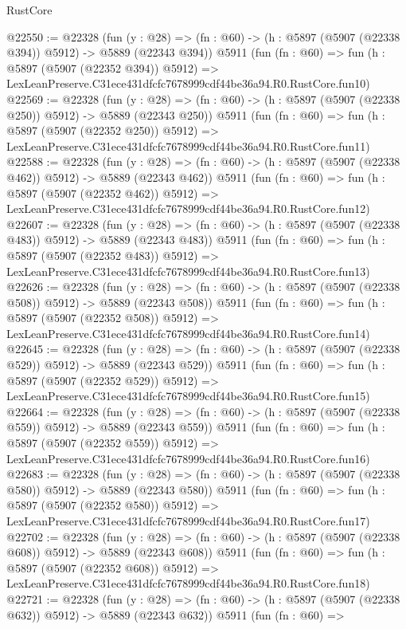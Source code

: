 \begin{lexlean}{RustCore}
\begin{coremodule}
@22550 := @22328
    (fun (y : @28) => (fn : @60) -> (h : @5897 (@5907 (@22338 @394)) @5912) -> @5889 (@22343 @394))
    @5911
    (fun (fn : @60) =>
    fun (h : @5897 (@5907 (@22352 @394)) @5912) =>
    LexLeanPreserve.C31ece431dfcfc7678999cdf44be36a94.R0.RustCore.fun10)
@22569 := @22328
    (fun (y : @28) => (fn : @60) -> (h : @5897 (@5907 (@22338 @250)) @5912) -> @5889 (@22343 @250))
    @5911
    (fun (fn : @60) =>
    fun (h : @5897 (@5907 (@22352 @250)) @5912) =>
    LexLeanPreserve.C31ece431dfcfc7678999cdf44be36a94.R0.RustCore.fun11)
@22588 := @22328
    (fun (y : @28) => (fn : @60) -> (h : @5897 (@5907 (@22338 @462)) @5912) -> @5889 (@22343 @462))
    @5911
    (fun (fn : @60) =>
    fun (h : @5897 (@5907 (@22352 @462)) @5912) =>
    LexLeanPreserve.C31ece431dfcfc7678999cdf44be36a94.R0.RustCore.fun12)
@22607 := @22328
    (fun (y : @28) => (fn : @60) -> (h : @5897 (@5907 (@22338 @483)) @5912) -> @5889 (@22343 @483))
    @5911
    (fun (fn : @60) =>
    fun (h : @5897 (@5907 (@22352 @483)) @5912) =>
    LexLeanPreserve.C31ece431dfcfc7678999cdf44be36a94.R0.RustCore.fun13)
@22626 := @22328
    (fun (y : @28) => (fn : @60) -> (h : @5897 (@5907 (@22338 @508)) @5912) -> @5889 (@22343 @508))
    @5911
    (fun (fn : @60) =>
    fun (h : @5897 (@5907 (@22352 @508)) @5912) =>
    LexLeanPreserve.C31ece431dfcfc7678999cdf44be36a94.R0.RustCore.fun14)
@22645 := @22328
    (fun (y : @28) => (fn : @60) -> (h : @5897 (@5907 (@22338 @529)) @5912) -> @5889 (@22343 @529))
    @5911
    (fun (fn : @60) =>
    fun (h : @5897 (@5907 (@22352 @529)) @5912) =>
    LexLeanPreserve.C31ece431dfcfc7678999cdf44be36a94.R0.RustCore.fun15)
@22664 := @22328
    (fun (y : @28) => (fn : @60) -> (h : @5897 (@5907 (@22338 @559)) @5912) -> @5889 (@22343 @559))
    @5911
    (fun (fn : @60) =>
    fun (h : @5897 (@5907 (@22352 @559)) @5912) =>
    LexLeanPreserve.C31ece431dfcfc7678999cdf44be36a94.R0.RustCore.fun16)
@22683 := @22328
    (fun (y : @28) => (fn : @60) -> (h : @5897 (@5907 (@22338 @580)) @5912) -> @5889 (@22343 @580))
    @5911
    (fun (fn : @60) =>
    fun (h : @5897 (@5907 (@22352 @580)) @5912) =>
    LexLeanPreserve.C31ece431dfcfc7678999cdf44be36a94.R0.RustCore.fun17)
@22702 := @22328
    (fun (y : @28) => (fn : @60) -> (h : @5897 (@5907 (@22338 @608)) @5912) -> @5889 (@22343 @608))
    @5911
    (fun (fn : @60) =>
    fun (h : @5897 (@5907 (@22352 @608)) @5912) =>
    LexLeanPreserve.C31ece431dfcfc7678999cdf44be36a94.R0.RustCore.fun18)
@22721 := @22328
    (fun (y : @28) => (fn : @60) -> (h : @5897 (@5907 (@22338 @632)) @5912) -> @5889 (@22343 @632))
    @5911
    (fun (fn : @60) =>

\end{coremodule}
\end{lexlean}
